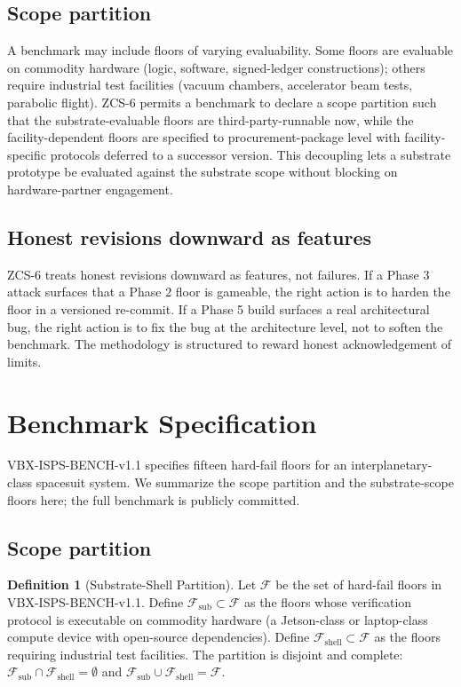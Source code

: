 \documentclass[conference]{IEEEtran}
\theoremstyle{definition}
\newtheorem{definition}{Definition}
\theoremstyle{plain}
\theoremstyle{remark}
\begin{document}
\subsection{Scope partition}

A benchmark may include floors of varying evaluability. Some floors are evaluable on commodity hardware (logic, software, signed-ledger constructions); others require industrial test facilities (vacuum chambers, accelerator beam tests, parabolic flight). ZCS-6 permits a benchmark to declare a scope partition such that the substrate-evaluable floors are third-party-runnable now, while the facility-dependent floors are specified to procurement-package level with facility-specific protocols deferred to a successor version. This decoupling lets a substrate prototype be evaluated against the substrate scope without blocking on hardware-partner engagement.

\subsection{Honest revisions downward as features}

ZCS-6 treats honest revisions downward as features, not failures. If a Phase 3 attack surfaces that a Phase 2 floor is gameable, the right action is to harden the floor in a versioned re-commit. If a Phase 5 build surfaces a real architectural bug, the right action is to fix the bug at the architecture level, not to soften the benchmark. The methodology is structured to reward honest acknowledgement of limits.

\section{Benchmark Specification}
\label{sec:bench}

VBX-ISPS-BENCH-v1.1 specifies fifteen hard-fail floors for an interplanetary-class spacesuit system. We summarize the scope partition and the substrate-scope floors here; the full benchmark is publicly committed.

\subsection{Scope partition}

\begin{definition}[Substrate-Shell Partition]
\label{def:partition}
Let $\mathcal{F}$ be the set of hard-fail floors in VBX-ISPS-BENCH-v1.1. Define $\mathcal{F}_{\text{sub}} \subset \mathcal{F}$ as the floors whose verification protocol is executable on commodity hardware (a Jetson-class or laptop-class compute device with open-source dependencies). Define $\mathcal{F}_{\text{shell}} \subset \mathcal{F}$ as the floors requiring industrial test facilities. The partition is disjoint and complete: $\mathcal{F}_{\text{sub}} \cap \mathcal{F}_{\text{shell}} = \emptyset$ and $\mathcal{F}_{\text{sub}} \cup \mathcal{F}_{\text{shell}} = \mathcal{F}$.
\end{definition}
\end{document}
